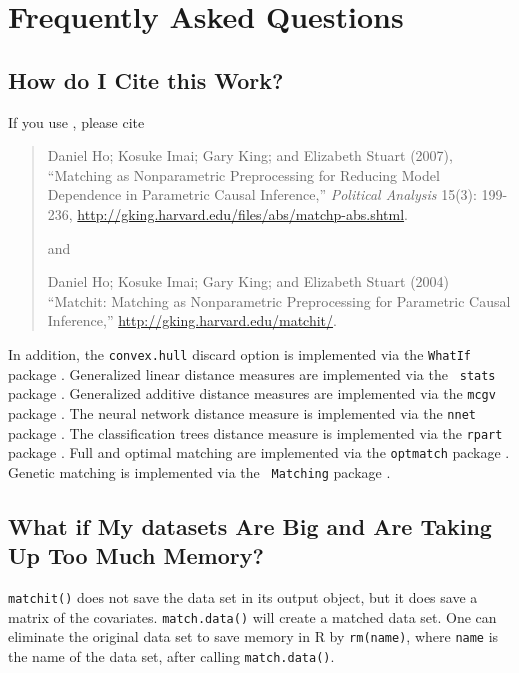 \chapter{Frequently Asked Questions}

\section{How do I Cite this Work?}

If you use \MatchIt, please cite\nocite{HoImaKin07,HoImaKin04}
\begin{verse}
  Daniel Ho; Kosuke Imai; Gary King; and Elizabeth Stuart (2007),
  ``Matching as Nonparametric Preprocessing for Reducing Model
  Dependence in Parametric Causal Inference,'' \emph{Political
    Analysis} 15(3): 199-236,
  \url{http://gking.harvard.edu/files/abs/matchp-abs.shtml}.

and 

Daniel Ho; Kosuke Imai; Gary King; and Elizabeth Stuart (2004)
``Matchit: Matching as Nonparametric Preprocessing for Parametric
Causal Inference,'' \url{http://gking.harvard.edu/matchit/}.
\end{verse}

In addition, the {\tt convex.hull} discard option is implemented via
the {\tt WhatIf} package \citep{KinZen06,KinZen07,StoKinZen05}.
Generalized linear distance measures are implemented via the {\tt
  stats} package \citep{VenRip02}.  Generalized additive distance
measures are implemented via the {\tt mcgv} package \citep{HasTib90}.
The neural network distance measure is implemented via the {\tt nnet}
package \citep{Ripley96}.  The classification trees distance measure
is implemented via the {\tt rpart} package \citep{BreFriOls84}.  Full
and optimal matching are implemented via the {\tt optmatch} package
\citep{Hansen04}.  Genetic matching is implemented via the {\tt
  Matching} package \citep{DiaSek05}.

\section{What if My datasets Are Big and Are Taking Up
  Too Much Memory?}

{\tt matchit()} does not save the data set in its output object, but
it does save a matrix of the covariates.  {\tt match.data()} will
create a matched data set. One can eliminate the original data set to
save memory in R by {\tt rm(name)}, where {\tt name} is the name of
the data set, after calling {\tt match.data()}.


